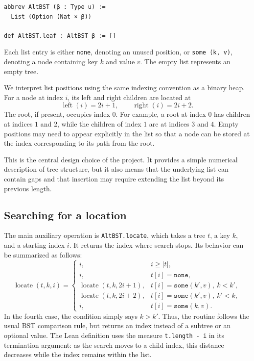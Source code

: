 \documentclass[10pt]{article}
\begin{document}
\begin{lstlisting}
abbrev AltBST (β : Type u) :=
  List (Option (Nat × β))

def AltBST.leaf : AltBST β := []
\end{lstlisting}

Each list entry is either \texttt{none}, denoting an unused position, or \texttt{some (k, v)}, denoting a node containing key $k$ and value $v$. The empty list represents an empty tree.

We interpret list positions using the same indexing convention as a binary heap. For a node at index $i$, its left and right children are located at
\[
  \operatorname{left}(i)=2i+1,
  \qquad
  \operatorname{right}(i)=2i+2.
\]
The root, if present, occupies index $0$. For example, a root at index $0$ has children at indices $1$ and $2$, while the children of index $1$ are at indices $3$ and $4$. Empty positions may need to appear explicitly in the list so that a node can be stored at the index corresponding to its path from the root.

This is the central design choice of the project. It provides a simple numerical description of tree structure, but it also means that the underlying list can contain gaps and that insertion may require extending the list beyond its previous length.

\subsection{Searching for a location}

The main auxiliary operation is \texttt{AltBST.locate}, which takes a tree $t$, a key $k$, and a starting index $i$. It returns the index where search stops. Its behavior can be summarized as follows:
\[
\operatorname{locate}(t,k,i)=
\begin{cases}
 i, & i\geq |t|,\\
 i, & t[i]=\texttt{none},\\
 \operatorname{locate}(t,k,2i+1), & t[i]=\texttt{some}(k',v),\ k<k',\\
 \operatorname{locate}(t,k,2i+2), & t[i]=\texttt{some}(k',v),\ k'<k,\\
 i, & t[i]=\texttt{some}(k,v).
\end{cases}
\]
In the fourth case, the condition simply says $k>k'$. Thus, the routine follows the usual BST comparison rule, but returns an index instead of a subtree or an optional value. The Lean definition uses the measure \texttt{t.length - i} in its termination argument: as the search moves to a child index, this distance decreases while the index remains within the list.
\end{document}
